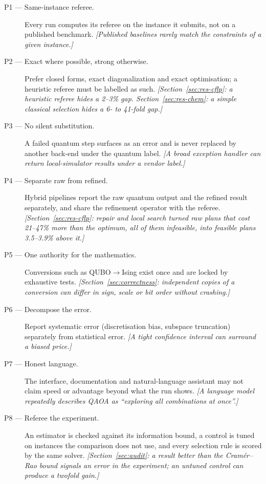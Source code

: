 \documentclass[11pt,a4paper]{article}
\begin{document}
\begin{description}
  \item[P1 --- Same-instance referee.] Every run computes its referee on the
        instance it submits, not on a published benchmark. \emph{[Published
        baselines rarely match the constraints of a given instance.]}
  \item[P2 --- Exact where possible, strong otherwise.] Prefer closed forms,
        exact diagonalization and exact optimisation; a heuristic referee must
        be labelled as such. \emph{[Section~\ref{sec:res-cflp}: a heuristic
        referee hides a 2--3\% gap. Section~\ref{sec:res-chem}: a simple
        classical selection hides a 6- to 41-fold gap.]}
  \item[P3 --- No silent substitution.] A failed quantum step surfaces as an
        error and is never replaced by another back-end under the quantum
        label. \emph{[A broad exception handler can return local-simulator
        results under a vendor label.]}
  \item[P4 --- Separate raw from refined.] Hybrid pipelines report the raw
        quantum output and the refined result separately, and share the
        refinement operator with the referee. \emph{[Section~\ref{sec:res-cflp}:
        repair and local search turned raw plans that cost 21--47\% more
        than the optimum, all of them infeasible, into feasible plans
        3.5--3.9\% above it.]}
  \item[P5 --- One authority for the mathematics.] Conversions such as
        QUBO$\to$Ising exist once and are locked by exhaustive tests.
        \emph{[Section~\ref{sec:correctness}: independent copies of a
        conversion can differ in sign, scale or bit order without
        crashing.]}
  \item[P6 --- Decompose the error.] Report systematic error (discretisation
        bias, subspace truncation) separately from statistical error.
        \emph{[A tight confidence interval can surround a biased price.]}
  \item[P7 --- Honest language.] The interface, documentation and
        natural-language assistant may not claim speed or advantage beyond
        what the run shows. \emph{[A language model repeatedly describes QAOA
        as ``exploring all combinations at once''.]}
  \item[P8 --- Referee the experiment.] An estimator is checked against its
        information bound, a control is tuned on instances the comparison
        does not use, and every selection rule is scored by the same solver.
        \emph{[Section~\ref{sec:audit}: a result better than the Cram\'er--Rao
        bound signals an error in the experiment; an untuned control can
        produce a twofold gain.]}
\end{description}
\end{document}
